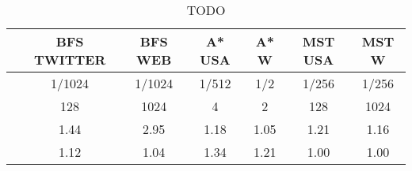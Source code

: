 \begin{table}[h]
\centring
\begin{tabular}{ |c|c|c|c|c|c|c| }
\hline
 & \large{\textbf{BFS TWITTER}} & \large{\textbf{BFS WEB}} & \large{\textbf{A* USA}} & \large{\textbf{A* W}} & \large{\textbf{MST USA}} & \large{\textbf{MST W}} \\
\hline
\insprob{} & 1/1024 & 1/1024 & 1/512 & 1/2 & 1/256 & 1/256 \\
\hline
\delbatch{} & 128 & 1024 & 4 & 2 & 128 & 1024 \\
\hline
\speed{} & 1.44 & 2.95 & 1.18 & 1.05 & 1.21 & 1.16 \\
\hline
\workinc{} & 1.12 & 1.04 & 1.34 & 1.21 & 1.00 & 1.00 \\
\hline
\end{tabular}
\vspace{0.3em}
\caption{TODO }
\label{table:todo}
\end{table}
